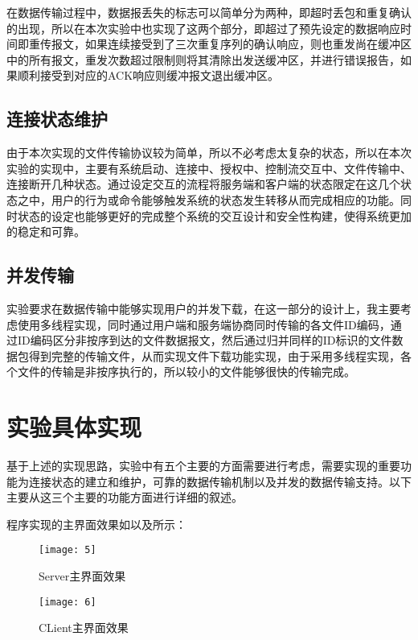 \documentclass[lang=cn,11pt]{elegantpaper}
\begin{document}
在数据传输过程中，数据报丢失的标志可以简单分为两种，即超时丢包和重复确认的出现，所以在本次实验中也实现了这两个部分，即超过了预先设定的数据响应时间即重传报文，如果连续接受到了三次重复序列的确认响应，则也重发尚在缓冲区中的所有报文，重发次数超过限制则将其清除出发送缓冲区，并进行错误报告，如果顺利接受到对应的ACK响应则缓冲报文退出缓冲区。

\subsection{连接状态维护}

由于本次实现的文件传输协议较为简单，所以不必考虑太复杂的状态，所以在本次实验的实现中，主要有系统启动、连接中、授权中、控制流交互中、文件传输中、连接断开几种状态。通过设定交互的流程将服务端和客户端的状态限定在这几个状态之中，用户的行为或命令能够触发系统的状态发生转移从而完成相应的功能。同时状态的设定也能够更好的完成整个系统的交互设计和安全性构建，使得系统更加的稳定和可靠。

\subsection{并发传输}

实验要求在数据传输中能够实现用户的并发下载，在这一部分的设计上，我主要考虑使用多线程实现，同时通过用户端和服务端协商同时传输的各文件ID编码，通过ID编码区分非按序到达的文件数据报文，然后通过归并同样的ID标识的文件数据包得到完整的传输文件，从而实现文件下载功能实现，由于采用多线程实现，各个文件的传输是非按序执行的，所以较小的文件能够很快的传输完成。

\section{实验具体实现}

基于上述的实现思路，实验中有五个主要的方面需要进行考虑，需要实现的重要功能为连接状态的建立和维护，可靠的数据传输机制以及并发的数据传输支持。以下主要从这三个主要的功能方面进行详细的叙述。

程序实现的主界面效果如以及所示：

\begin{figure}[H]
	\centering
	\texttt{[image: 5]}
	\caption{Server主界面效果\label{fig:5}}
\end{figure}

\begin{figure}[H]
	\centering
	\texttt{[image: 6]}
	\caption{CLient主界面效果 \label{fig:6}}
\end{figure}
\end{document}
